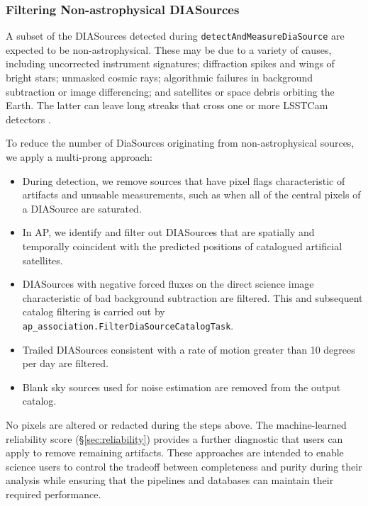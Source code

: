 \subsubsection{Filtering Non-astrophysical DIASources}
\label{sec:streaks}

A subset of the DIASources detected during \texttt{detectAndMeasureDiaSource} are expected to be non-astrophysical.
These may be due to a variety of causes, including uncorrected instrument signatures; diffraction spikes and wings of bright stars; unmasked cosmic rays; algorithmic failures in background subtraction or image differencing; and satellites or space debris orbiting the Earth.
The latter can leave long streaks that cross one or more LSSTCam detectors
\citep{2020AJ....160..226T,2022A&C....3900584H}.

To reduce the number of DiaSources originating from non-astrophysical sources, we apply a multi-prong approach:

\begin{itemize}
\item During detection, we remove sources that have pixel flags characteristic of artifacts and unusable measurements, such as when all of the central pixels of a DIASource are saturated.

\item In AP, we identify and filter out DIASources that are spatially and temporally coincident with the predicted positions of catalogued artificial satellites.

\item DIASources with negative forced fluxes on the direct science image characteristic of bad background subtraction are filtered.  This and subsequent catalog filtering is carried out by \texttt{ap\_association.FilterDiaSourceCatalogTask}.

\item Trailed DIASources consistent with a rate of motion greater than 10 degrees per day are filtered.

\item Blank sky sources used for noise estimation are removed from the output catalog.

\end{itemize}

No pixels are altered or redacted during the steps above.
The machine-learned reliability score (\S\ref{sec:reliability}) provides a further diagnostic that users can apply to remove remaining artifacts.
These approaches are intended to enable science users to control the tradeoff between completeness and purity during their analysis while ensuring that the pipelines and databases can maintain their required performance.

